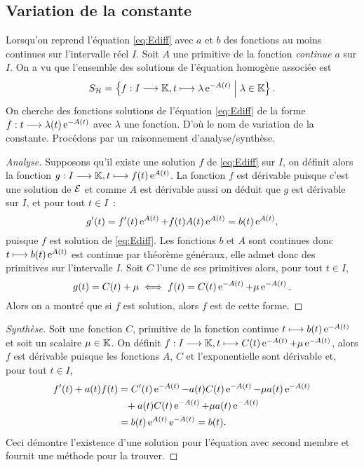 \subsection{Variation de la constante}
\label{subsec:variationdelaconstante}
Lorsqu'on reprend l'équation \eqref{eq:Ediff} avec \(a\) et \(b\) des fonctions au moins continues sur l'intervalle réel \(I\). Soit \(A\) une primitive de la fonction \emph{continue} \(a\) sur \(I\). On a vu que l'ensemble des solutions de l'équation homogène associée est
\begin{equation}
    S_{\mathcal{H}}=\left\{f:I \longrightarrow \mathbb{K}, t \longmapsto \lambda \operatorname{e}^{-A(t)}\mathrel{}\middle|\mathrel{}\lambda \in \mathbb{K}\right\}.
\end{equation}
On cherche des fonctions solutions de l'équation \eqref{eq:Ediff} de la forme \(f:t \longrightarrow \lambda(t)\operatorname{e}^{-A(t)}\) avec \(\lambda\) une fonction. D'où le nom de variation de la constante. Procédons par un raisonnement d'analyse/synthèse.
\begin{proof}[Analyse] Supposons qu'il existe une solution \(f\) de \eqref{eq:Ediff} sur \(I\), on définit alors la fonction \(g:I \longrightarrow \mathbb{K}, t \longmapsto f(t)\operatorname{e}^{A(t)}\). La fonction \(f\) est dérivable puisque c'est une solution de \(\mathcal{E}\) et comme \(A\) est dérivable aussi on déduit que \(g\) est dérivable sur \(I\), et pour tout \(t \in I\)~:
\begin{equation}
  g'(t)=f'(t)\operatorname{e}^{A(t)}+f(t)A(t)\operatorname{e}^{A(t)}=b(t)\operatorname{e}^{A(t)},
\end{equation}
puisque \(f\) est solution de \eqref{eq:Ediff}. Les fonctions \(b\) et \(A\) sont continues donc \(t \longmapsto b(t)\operatorname{e}^{A(t)}\) est continue par théorème généraux, elle admet donc des primitives sur l'intervalle \(I\). Soit \(C\) l'une de ses primitives alors, pour tout \(t \in I\), 
\begin{equation}
  g(t) = C(t) + \mu \iff f(t)=C(t)\operatorname{e}^{-A(t)} + \mu \operatorname{e}^{-A(t)}.
\end{equation}
Alors on a montré que si \(f\) est solution, alors \(f\) est de cette forme.
\end{proof}
\begin{proof}[Synthèse] Soit une fonction \(C\), primitive de la fonction continue \(t \longmapsto b(t)\operatorname{e}^{-A(t)}\) et soit un scalaire \(\mu \in \mathbb{K}\). On définit \(f:I \longrightarrow \mathbb{K}, t \longmapsto C(t)\operatorname{e}^{-A(t)}+\mu \operatorname{e}^{-A(t)}\), alors \(f\) est dérivable puisque les fonctions \(A\), \(C\) et l'exponentielle sont dérivable et, pour tout \(t \in I\),
  \begin{align}
    f'(t)+a(t)f(t)&=C'(t) \operatorname{e}^{-A(t)} -a(t)C(t)\operatorname{e}^{-A(t)}-\mu a(t) \operatorname{e}^{-A(t)} \notag \\ 
    &\phantom{=}+ a(t)C(t)\operatorname{e}^{-A(t)} + \mu a(t) \operatorname{e}^{-A(t)} \\ 
    & = b(t) \operatorname{e}^{A(t)} \operatorname{e}^{-A(t)}=b(t).
  \end{align}
Ceci démontre l'existence d'une solution pour l'équation avec second membre et fournit une méthode pour la trouver.
\end{proof}
